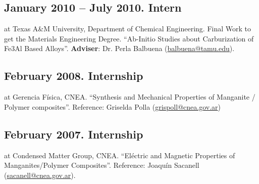 \subsection{January 2010 – July 2010. Intern } at Texas A\&M University, Department of Chemical Engineering. Final Work to get the Materials Engineering Degree. “Ab-Initio Studies about Carburization of Fe3Al Based Alloys”. \textbf{Adviser}: Dr. Perla Balbuena (\url{balbuena@tamu.edu}). 

\subsection{February 2008. Internship }at Gerencia Física, CNEA. “Synthesis and Mechanical Properties of Manganite / Polymer composites”. Reference: Griselda Polla (\url{grispoll@cnea.gov.ar})

\subsection{February 2007. Internship} at Condensed Matter Group, CNEA. “Eléctric and Magnetic Properties of Manganites/Polymer Composites”. Reference: Joaquín Sacanell (\url{sacanell@cnea.gov.ar}). 

